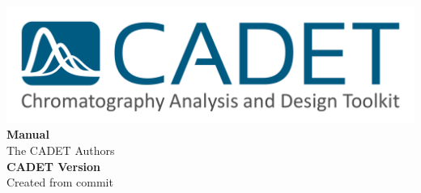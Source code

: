 \documentclass[%
a4paper, %
DIV=14,
BCOR=8mm,
10pt,
titlepage,
twoside,
toc=bibliography,
toc=index,
toc=listof,
toc=graduated,
]{scrreprt}
\begin{document}
%
\begin{titlepage}%
	\setcounter{page}{-100}%
	\begin{center}
		\includegraphics[width=0.6\linewidth]{../logo/CADET-Logo} \\
		\vspace{8cm}
		{\Huge\textbf{Manual}}\\
		\vspace{3cm}
		{The CADET Authors}\\
		\vspace{5cm}
		\textbf{CADET Version }\\
		\vspace{0.8cm}
		{\footnotesize Created from commit }
	\end{center}
\end{titlepage}

\newpage
\cleardoublepage

\tableofcontents

\newpage
\listoffigures

\newpage
\listoftables

\newpage
{}

%





\printbibliography

\printindex
\end{document}
